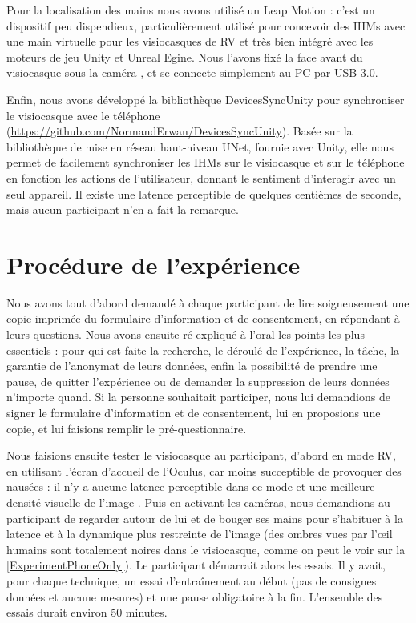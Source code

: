 
Pour la localisation des mains nous avons utilisé un Leap Motion : c'est un dispositif peu dispendieux, particulièrement utilisé pour concevoir des IHMs avec une main virtuelle pour les visiocasques de RV et très bien intégré avec les moteurs de jeu Unity et Unreal Egine. Nous l'avons fixé la face avant du visiocasque sous la caméra , et se connecte simplement au PC par USB 3.0.

Enfin, nous avons développé la bibliothèque DevicesSyncUnity pour synchroniser le visiocasque avec le téléphone (\url{https://github.com/NormandErwan/DevicesSyncUnity}). Basée sur la bibliothèque de mise en réseau haut-niveau UNet, fournie avec Unity, elle nous permet de facilement synchroniser les IHMs sur le visiocasque et sur le téléphone en fonction les actions de l'utilisateur, donnant le sentiment d'interagir avec un seul appareil. Il existe une latence perceptible de quelques centièmes de seconde, mais aucun participant n'en a fait la remarque.


\section{Procédure de l'expérience}
\label{sec:experiment_procedure}

Nous avons tout d'abord demandé à chaque participant de lire soigneusement une copie imprimée du formulaire d'information et de consentement, en répondant à leurs questions. Nous avons ensuite ré-expliqué à l'oral les points les plus essentiels : pour qui est faite la recherche, le déroulé de l'expérience, la tâche, la garantie de l'anonymat de leurs données, enfin la possibilité de prendre une pause, de quitter l'expérience ou de demander la suppression de leurs données n'importe quand. Si la personne souhaitait participer, nous lui demandions de signer le formulaire d'information et de consentement, lui en proposions une copie, et lui faisions remplir le pré-questionnaire.

Nous faisions ensuite tester le visiocasque au participant, d'abord en mode RV, en utilisant l'écran d'accueil de l'Oculus, car moins succeptible de provoquer des nausées : il n'y a aucune latence perceptible dans ce mode et une meilleure densité visuelle de l'image . Puis en activant les caméras, nous demandions au participant de regarder autour de lui et de bouger ses mains pour s'habituer à la latence et à la dynamique plus restreinte de l'image (des ombres vues par l'\oe il humains sont totalement noires dans le visiocasque, comme on peut le voir sur la \autoref{ExperimentPhoneOnly}). Le participant démarrait alors les essais. Il y avait, pour chaque technique, un essai d'entraînement au début (pas de consignes données et aucune mesures) et une pause obligatoire à la fin. L'ensemble des essais durait environ 50 minutes.

